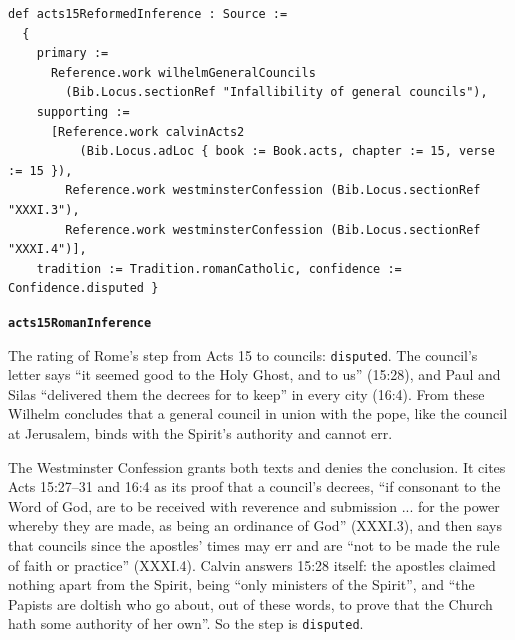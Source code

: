 \documentclass[11pt]{article}
\begin{document}
{\small\begin{verbatim}
def acts15ReformedInference : Source :=
  {
    primary :=
      Reference.work wilhelmGeneralCouncils
        (Bib.Locus.sectionRef "Infallibility of general councils"),
    supporting :=
      [Reference.work calvinActs2
          (Bib.Locus.adLoc { book := Book.acts, chapter := 15, verse := 15 }),
        Reference.work westminsterConfession (Bib.Locus.sectionRef "XXXI.3"),
        Reference.work westminsterConfession (Bib.Locus.sectionRef "XXXI.4")],
    tradition := Tradition.romanCatholic, confidence := Confidence.disputed }
\end{verbatim}}
\par\medskip\noindent\textbf{\texttt{acts15\allowbreak{}Roman\allowbreak{}Inference}}\par\nobreak\noindent
The rating of Rome’s step from Acts 15 to councils: \texttt{disputed}. The council’s letter says “it seemed good to the Holy Ghost, and to us” (15:28), and Paul and Silas “delivered them the decrees for to keep” in every city (16:4). From these Wilhelm concludes that a general council in union with the pope, like the council at Jerusalem, binds with the Spirit’s authority and cannot err.

The Westminster Confession grants both texts and denies the conclusion. It cites Acts 15:27–31 and 16:4 as its proof that a council’s decrees, “if consonant to the Word of God, are to be received with reverence and submission ... for the power whereby they are made, as being an ordinance of God” (XXXI.3), and then says that councils since the apostles’ times may err and are “not to be made the rule of faith or practice” (XXXI.4). Calvin answers 15:28 itself: the apostles claimed nothing apart from the Spirit, being “only ministers of the Spirit”, and “the Papists are doltish who go about, out of these words, to prove that the Church hath some authority of her own”. So the step is \texttt{disputed}.
\end{document}
